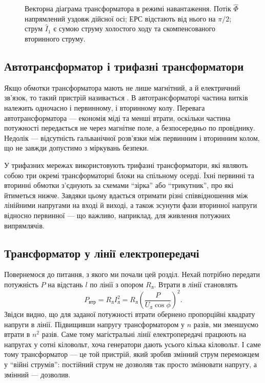 \begin{figure}[h!]
	\centering
	\caption{Векторна діаграма трансформатора в режимі
	навантаження. Потік $\hat{\Phi}$ напрямлений уздовж
	дійсної осі; ЕРС відстають від нього на $\pi/2$; струм
	$\hat{I}_1$ є сумою струму холостого ходу та
	скомпенсованого вторинного струму.}
	\label{tikz:transformer_phasor}
\end{figure}

\subsection*{Автотрансформатор і трифазні трансформатори}

Якщо обмотки трансформатора мають не лише магнітний, а й
електричний зв'язок, то такий пристрій називається
. В автотрансформаторі частина
витків належить одночасно і первинному, і вторинному колу.
Перевага автотрансформатора --- економія міді та менші втрати,
оскільки частина потужності передається не через магнітне поле,
а безпосередньо по провіднику. Недолік --- відсутність
гальванічної розв'язки між первинним і вторинним колом, що не
завжди допустимо з міркувань безпеки.

У трифазних мережах використовують трифазні трансформатори, які
являють собою три окремі трансформаторні блоки на спільному
осерді. Їхні первинні та вторинні обмотки з'єднують за схемами
\enquote{зірка} або \enquote{трикутник}, про які йтиметься нижче.
Завдяки цьому вдається отримати різні співвідношення між
лінійними напругами на вході й виході, а також зсунути фази
вторинної напруги відносно первинної --- що важливо, наприклад,
для живлення потужних випрямлячів.

\subsection*{Трансформатор у лінії електропередачі}

Повернемося до питання, з якого ми почали цей розділ. Нехай
потрібно передати потужність $P$ на відстань $l$ по лінії з
опором $R_{\text{л}}$. Втрати в лінії становлять
\begin{equation}\label{eq:line_losses_transformer}
	P_{\text{втр}} = R_{\text{л}} I_{\text{л}}^2
	                = R_{\text{л}} \left(\frac{P}{U_{\text{л}}\cos\phi}\right)^2.
\end{equation}
Звідси видно, що для заданої потужності втрати обернено
пропорційні квадрату напруги в лінії. Підвищивши напругу
трансформатором у $n$ разів, ми зменшуємо втрати в $n^2$ разів.
Саме тому магістральні лінії електропередачі працюють на
напругах у сотні кіловольт, хоча генератори дають усього
кілька кіловольт. І саме тому трансформатор --- це той пристрій,
який зробив змінний струм переможцем у \enquote{війні струмів}:
постійний струм не дозволяв так просто змінювати напругу, а
змінний --- дозволив.

